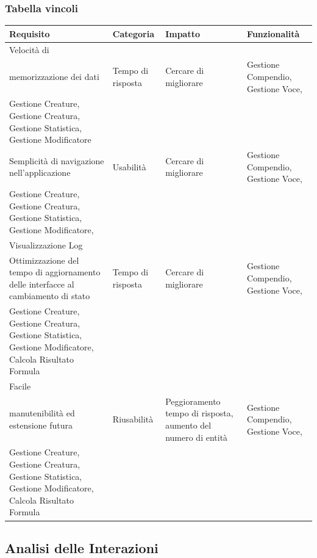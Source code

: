 \documentclass[a4paper, 11pt]{article}
\let\newline\\
\begin{document}
\subsubsection*{Tabella vincoli}
\begin{center}
    \begin{tabular}{|p{3cm}|p{3cm}|p{3.5cm}|p{4cm\RaggedRight}|}
        \hline
        \textbf{Requisito} & \textbf{Categoria} & \textbf{Impatto} & \textbf{Funzionalità} \\
        \hline
        Velocità di \newline memorizzazione dei dati & Tempo di risposta & Cercare di migliorare & Gestione Compendio, Gestione Voce, \newline Gestione Creature, Gestione Creatura, Gestione Statistica, Gestione Modificatore \\
        \hline
        Semplicità di navigazione nell'applicazione & Usabilità & Cercare di migliorare & Gestione Compendio, Gestione Voce, \newline Gestione Creature, Gestione Creatura, Gestione Statistica, Gestione Modificatore, \newline Visualizzazione Log \\
        \hline
        Ottimizzazione del tempo di aggiornamento delle interfacce al cambiamento di stato & Tempo di risposta & Cercare di migliorare & Gestione Compendio, Gestione Voce, \newline Gestione Creature, Gestione Creatura, Gestione Statistica, Gestione Modificatore, Calcola Risultato Formula \\
        \hline
        Facile \newline manutenibilità ed estensione futura & Riusabilità & Peggioramento tempo di risposta, aumento del numero di entità & Gestione Compendio, Gestione Voce, \newline Gestione Creature, Gestione Creatura, Gestione Statistica, Gestione Modificatore, Calcola Risultato Formula \\
        \hline
    \end{tabular}
\end{center}

\clearpage
\newpage
\subsection{Analisi delle Interazioni}
\end{document}
